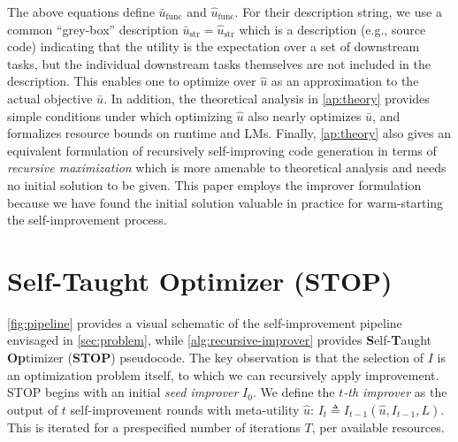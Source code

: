 \documentclass{article} %
\newcommand{\metautil}{{\hat{u}}}
\newcommand{\exputil}{{\bar{u}}}
\newcommand{\defeq}{\triangleq}
\begin{document}
The above equations define $\exputil_\text{func}$ and $\metautil_\text{func}$. For their description string, we use a common ``grey-box'' description $\exputil_\text{str}=\metautil_\text{str}$ which is a description (e.g., source code) indicating that the utility is the expectation over a set of downstream tasks, but the individual downstream tasks themselves are not included in the description. This enables one to optimize over $\metautil$ as an approximation to the actual objective $\exputil$. 
In addition, the theoretical analysis in \cref{ap:theory} provides simple conditions under which optimizing $\metautil$ also nearly optimizes $\exputil$, and formalizes resource bounds on runtime and LMs.
%
%
Finally, \cref{ap:theory} also %
gives an equivalent formulation of recursively self-improving code generation in terms of \textit{recursive maximization} which is more amenable to theoretical analysis and needs no initial solution to be given. This paper employs the improver formulation because we have found the initial solution valuable in practice for warm-starting the self-improvement process. 



%
%
%
%
%
%
%

%
\section{Self-Taught Optimizer (STOP)}
%
\label{sec:stop}

\cref{fig:pipeline} provides a visual schematic of the self-improvement pipeline envisaged in \cref{sec:problem}, while 
\cref{alg:recursive-improver} provides \textbf{S}elf-\textbf{T}aught \textbf{Op}timizer (\textbf{STOP}) pseudocode. 
%
%
%
%
%
The key observation is that the selection of $I$ is an optimization problem itself, to which we can recursively apply improvement. STOP begins with an initial \emph{seed improver} $I_0$. We define the \emph{$t$-th improver} as the output of $t$  self-improvement rounds with meta-utility $\metautil$:
%
$
%
I_{t} \defeq I_{t-1}(\metautil, I_{t-1}, L).\label{eq:it}
%
%
$
This is iterated for a prespecified number of iterations $T$, per available resources. \vspace{-2px}

%
\end{document}
